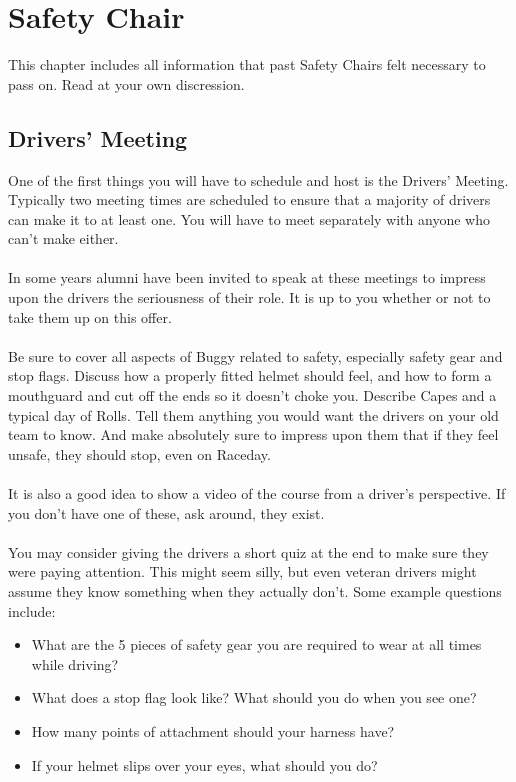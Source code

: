 \chapter{Safety Chair}
\label{ch:Safety}

This chapter includes all information that past Safety Chairs felt necessary
to pass on. Read at your own discression.

\section{Drivers' Meeting}
\label{sec:Driver's Meeting}
One of the first things you will have to schedule and host is the Drivers'
Meeting. Typically two meeting times are scheduled to ensure that a majority
of drivers can make it to at least one. You will have to meet separately
with anyone who can't make either.
\\\\
In some years alumni have been invited to speak at these meetings to impress
upon the drivers the seriousness of their role. It is up to you whether
or not to take them up on this offer.
\\\\
Be sure to cover all aspects of Buggy related to safety, especially safety
gear and stop flags. Discuss how a properly fitted helmet should feel, and how
to form a mouthguard and cut off the ends so it doesn't choke you. Describe
Capes and a typical day of Rolls. Tell them anything you would want the
drivers on your old team to know. And make absolutely sure to impress upon
them that if they feel unsafe, they should stop, even on Raceday.
\\\\
It is also a good idea to show a video of the course
from a driver's perspective. If you don't have one of these, ask around,
they exist.
\\\\
You may consider giving the drivers a short quiz at the end to make sure they
were paying attention. This might seem silly, but even veteran drivers might
assume they know something when they actually don't. Some example questions
include:
\begin{itemize}
\item What are the 5 pieces of safety gear you are required to wear at all
times while driving?
\item What does a stop flag look like? What should you do when you see one?
\item How many points of attachment should your harness have?
\item If your helmet slips over your eyes, what should you do?
\end{itemize}

